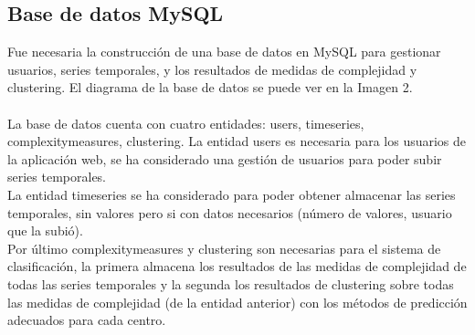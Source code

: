 \documentclass[14pt]{extarticle}
\theoremstyle{definition}
\theoremstyle{remark}
\begin{document}
\subsection{Base de datos MySQL}\label{sec:basededatosmysql}
Fue necesaria la construcción de una base de datos en MySQL para gestionar usuarios, series temporales, y los resultados de medidas de complejidad y clustering. El diagrama de la base de datos se puede ver en la Imagen 2.\\\\La base de datos cuenta con cuatro entidades: users, timeseries, complexitymeasures, clustering. La entidad users es necesaria para los usuarios de la aplicación web, se ha considerado una gestión de usuarios para poder subir series temporales.\\La entidad timeseries se ha considerado para poder obtener almacenar las series temporales, sin valores pero si con datos necesarios (número de valores, usuario que la subió).\\Por último complexitymeasures y clustering son necesarias para el sistema de clasificación, la primera almacena los resultados de las medidas de complejidad de todas las series temporales y la segunda los resultados de clustering sobre todas las medidas de complejidad (de la entidad anterior) con los métodos de predicción adecuados para cada centro.
\newpage
\end{document}
